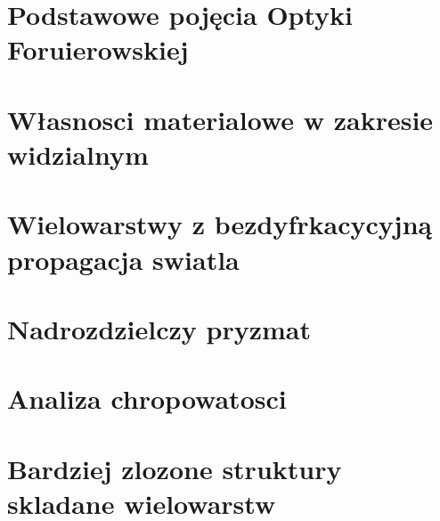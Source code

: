 
\section{Podstawowe pojęcia Optyki Foruierowskiej}
\section{Własnosci materialowe w zakresie widzialnym}
\section{Wielowarstwy z bezdyfrkacycyjną propagacja swiatla}
\section{Nadrozdzielczy pryzmat}
\section{Analiza chropowatosci}
\section{Bardziej zlozone struktury skladane wielowarstw}





